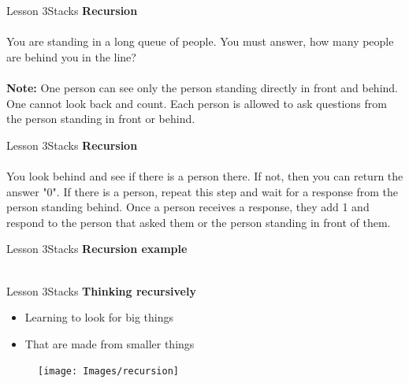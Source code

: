 \documentclass[aspectratio=1610]{beamer}
\begin{document}
\begin{frame}{Lesson 3}{Stacks}
\LARGE
\textbf{Recursion}\\~\\
You are standing in a long queue of people. You must answer, how many
people are behind you in the line?\\~\\
\large
\textbf{Note:}
One person can see only the person standing directly in front and
behind. One cannot look back and count. Each person is allowed to ask
questions from the person standing in front or behind.
\end{frame}


\begin{frame}{Lesson 3}{Stacks}
\LARGE
\textbf{Recursion}\\~\\
You look behind and see if there is a person there. If not, then you
can return the answer "0". If there is a person, repeat this step 
and wait for a response from the person standing behind. Once a
person receives a response, they add 1 and respond to the person
that asked them or the person standing in front of them.
\end{frame}


\begin{frame}{Lesson 3}{Stacks}
\Large
\textbf{Recursion example}\\~\\
\label{personCount}
\begin{algorithmic}[1]
    \State {}
    \State {}    
\EndIf
\EndProcedure
\end{algorithmic}
\end{frame}



\begin{frame}{Lesson 3}{Stacks}
{\LARGE\textbf{{Thinking recursively}}}
\Large
\begin{minipage}{0.60\textwidth}
    \begin{itemize}
      \item Learning to look for big things 
      \item That are made from smaller things
    \end{itemize}
  \end{minipage}
\begin{minipage}{.0\textwidth}
      \begin{figure}
        \texttt{[image: Images/recursion]}
      \end{figure}
  \end{minipage}  
\end{frame}
\end{document}

